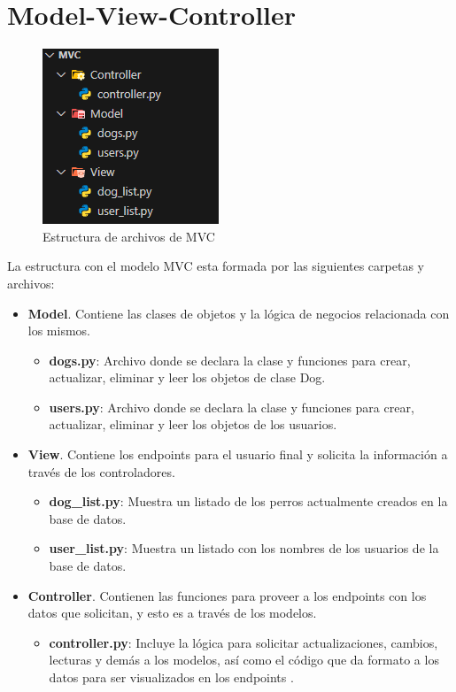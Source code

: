 \documentclass[11pt]{article}
\begin{document}
	\tableofcontents
	\listoffigures
	\lstset{inputencoding=utf8/latin1}
	\newpage \section{Model-View-Controller}
	\begin{figure}[ht!]
		\centering
		\includegraphics[width=0.3\linewidth]{img/mvc.png}
		\caption{Estructura de archivos de MVC}
		\label{fig:mvc}
	\end{figure}
	
	
		\par La estructura con el modelo MVC esta formada por las siguientes carpetas y archivos:
		\begin{itemize}
			\item \textbf{Model}. Contiene las clases de objetos y la lógica de negocios relacionada con los mismos.
				\begin{itemize}
					\item \textbf{dogs.py}: Archivo donde se declara la clase y funciones para crear, actualizar, eliminar y leer los objetos de clase Dog.
					\item \textbf{users.py}: Archivo donde se declara la clase y funciones para crear, actualizar, eliminar y leer los objetos de los usuarios.
				\end{itemize}
			\item \textbf{View}. Contiene los endpoints para el usuario final y solicita la información a través de los controladores.
				\begin{itemize}
					\item \textbf{dog\_list.py}: Muestra un listado de los perros actualmente creados en la base de datos.
					\item \textbf{user\_list.py}: Muestra un listado con los nombres de los usuarios de la base de datos.
				\end{itemize}
			\item \textbf{Controller}. Contienen las funciones para proveer a los endpoints con los datos que solicitan, y esto es a través de los modelos.
				\begin{itemize}
					\item \textbf{controller.py}: Incluye la lógica para solicitar actualizaciones, cambios, lecturas y demás a los modelos, así como el código que da formato a los datos para ser visualizados en los endpoints .
				\end{itemize}
		\end{itemize}
		
\end{document}

